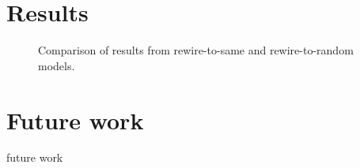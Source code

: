 \documentclass[11pt]{article}
\begin{document}
\section*{Results}
\begin{figure}[h]
\caption{Comparison of results from rewire-to-same and rewire-to-random models.}
\end{figure}

\section*{Future work}
future work



\end{document}
